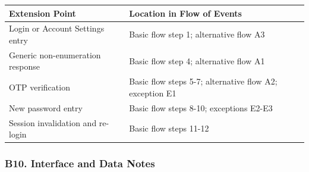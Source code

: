 \documentclass[12pt]{article}
\renewcommand{\baselinestretch}{1.5}
\begin{document}
\begingroup
\small
\renewcommand{\baselinestretch}{1.0}\selectfont
\renewcommand{\arraystretch}{1.15}
\setlength{\tabcolsep}{6pt}
\begin{longtable}{|>{\raggedright\arraybackslash}p{}|>{\raggedright\arraybackslash}p{}|}
\hline
\textbf{Extension Point} & \textbf{Location in Flow of Events} \\ \hline
\endhead
Login or Account Settings entry & Basic flow step 1; alternative flow A3 \\ \hline
Generic non-enumeration response & Basic flow step 4; alternative flow A1 \\ \hline
OTP verification & Basic flow steps 5-7; alternative flow A2; exception E1 \\ \hline
New password entry & Basic flow steps 8-10; exceptions E2-E3 \\ \hline
Session invalidation and re-login & Basic flow steps 11-12 \\ \hline
\end{longtable}
\endgroup
\par\medskip

\hypertarget{sec:b10-interface-and-data-notes}{}
\subsubsection*{B10. Interface and Data Notes}
\par\medskip
\end{document}

